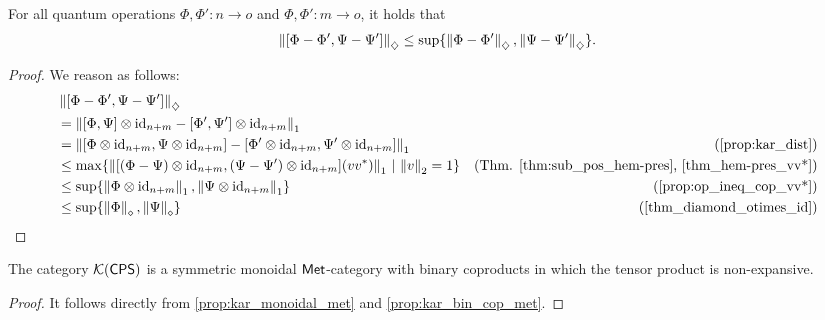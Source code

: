 \begin{proposition} \label{prop:kar_bin_cop_met}
  For all quantum operations $\Phi, \Phi': n \to o  $ and $\Phi, \Phi': m \to o $, it holds that
  \[ \left\lVert [\Phi-\Phi',\Psi-\Psi'] \right\rVert_{\diamondsuit} \leq \sup\{\left\lVert \Phi-\Phi' \right\rVert_{\diamondsuit},  \left\lVert \Psi-\Psi' \right\rVert_{\diamondsuit} \}.\]
\end{proposition}

\begin{proof}
  We reason as follows:
  \begin{equation*}
  \begin{split}
        & \diamondnorm{[\Phi-\Phi' ,\Psi-\Psi']} \\
        & =
        \tracenorm{[\Phi,\Psi] \otimes \id_{n+m} - [\Phi',\Psi'] \otimes \id_{n+m} }
        \\
        & = 
        \tracenorm{[\Phi \otimes \id_{n+m},\Psi \otimes \id_{n+m}] - [\Phi' \otimes \id_{n+m},\Psi' \otimes \id_{n+m}] } & (\text{\autoref{prop:kar_dist}})
        \\
        & \leq \max \{ \tracenorm{[(\Phi - \Psi) \otimes \id_{n+m} ,(\Psi - \Psi') \otimes \id_{n+m}] (vv^*)} \, | \, \euclideannorm{v}=1\}  & (\text{Thm. \ref{thm:sub_pos_hem-pres}, \ref{thm_hem-pres_vv*}})\\
        & \leq
        \sup \{ \tracenorm{\Phi \otimes \id_{n+m}}, \tracenorm{\Psi \otimes \id_{n+m}} \} & (\text{\autoref{prop:op_ineq_cop_vv*}})
        \\
        & \leq
        \sup \{ \norm{\Phi}_\diamond, \norm{\Psi}_\diamond \} & (\text{\autoref{thm_diamond_otimes_id}})
\end{split}
\end{equation*}
\end{proof}

\begin{theorem} 
  The category $\mathcal{K}{(\mathsf{CPS})}$ is a  symmetric monoidal $\mathsf{Met}$-category with binary coproducts in which  the tensor product is non-expansive.
\end{theorem}

\begin{proof}
  It follows directly from \autoref{prop:kar_monoidal_met} and \autoref{prop:kar_bin_cop_met}.
\end{proof}








